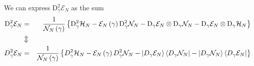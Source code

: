 \documentclass[aps,preprint]{revtex4}
\begin{document}
We can express $\mathrm{D}_{\gamma }^{2}\mathcal{E}_{N}$ as the sum 
\begin{eqnarray}
\mathrm{D}_{\gamma }^{2}\mathcal{E}_{N} &=&\frac{1}{\mathcal{N}_{N}\left( 
\mathbf{\gamma }\right) }\left\{ \mathrm{D}_{\gamma }^{2}\mathcal{H}_{N}-%
\mathcal{E}_{N}\left( \mathbf{\gamma }\right) \mathrm{D}_{\gamma }^{2}%
\mathcal{N}_{N}-\mathrm{D}_{\gamma }\mathcal{E}_{N}\otimes \mathrm{D}%
_{\gamma }\mathcal{N}_{N}-\mathrm{D}_{\gamma }\mathcal{E}_{N}\otimes \mathrm{%
D}_{\gamma }\mathcal{H}_{N}\right\} \\
&\Updownarrow &  \nonumber \\
D_{\gamma }^{2}\mathcal{E}_{N} &=&\frac{1}{\mathcal{N}_{N}\left( \mathbf{%
\gamma }\right) }\left\{ D_{\gamma }^{2}\mathcal{H}_{N}-\mathcal{E}%
_{N}\left( \mathbf{\gamma }\right) D_{\gamma }^{2}\mathcal{N}_{N}-\left\vert
D_{\gamma }\mathcal{E}_{N}\right\rangle \left\langle D_{\gamma }\mathcal{N}%
_{N}\right\vert -\left\vert D_{\gamma }\mathcal{N}_{N}\right\rangle
\left\langle D_{\gamma }\mathcal{E}_{N}\right\vert \right\}
\end{eqnarray}
\end{document}
